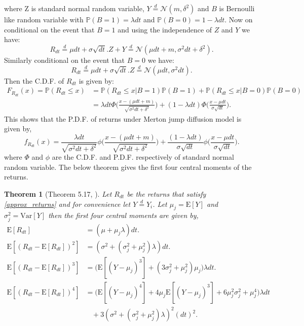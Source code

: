 \documentclass[12pt]{report}
\newtheorem{theorem}{Theorem}[section]
\newcommand{\E}{\mathrm{E}}
\newcommand{\Var}{\mathrm{Var}}
\begin{document}
where Z is standard normal random variable, $Y \stackrel{d}{=} \mathcal{N}(m,\delta^{2}) $  and $B$ is Bernoulli like random variable with $\mathbb{P}(B = 1) = \lambda dt$ and $\mathbb{P}(B = 0) = 1 - \lambda dt$.
Now on conditional on the event that $B=1$ and using the independence of $Z$ and $Y$ we have:
\begin{equation}
    R_{dt} \stackrel{d}{=} \mu dt + \sigma \sqrt{dt}.Z + Y \stackrel{d}{=} \mathcal{N}(\mu dt + m, \sigma^{2} dt + \delta^{2} ).   
\end{equation}
Similarly conditional on the event that $B=0$ we have:
\begin{equation}
    R_{dt} \stackrel{d}{=} \mu dt + \sigma \sqrt{dt}.Z  \stackrel{d}{=} \mathcal{N}(\mu dt, \sigma^{2} dt ).   
\end{equation}
Then the C.D.F. of $R_{dt}$  is given by:
\begin{align*}
    F_{R_{dt}}(x) = \mathbb{P}(R_{dt} \leq x) &= \mathbb{P}(R_{dt} \leq x | B =1) \mathbb{P}(B =1) + \mathbb{P}(R_{dt} \leq x | B = 0) \mathbb{P}(B =0)\\
    & = \lambda dt  \Phi\Bigg(\frac{x - (\mu dt + m)}{\sqrt{\sigma^{2} dt + \delta^{2}}}\Bigg) + (1 - \lambda dt) \Phi\Bigg(\frac{x-\mu dt}{\sigma \sqrt{dt}}\Bigg).
\end{align*}
This shows that the P.D.F. of returns under Merton jump diffusion model is given by,
\begin{equation}
    f_{R_{dt}}(x) =  \frac{\lambda dt}{\sqrt{\sigma^{2} dt + \delta^{2}}}  \phi\Bigg(\frac{x - (\mu dt + m)}{\sqrt{\sigma^{2} dt + \delta^{2}}}\Bigg) + \frac{(1 - \lambda dt)}{\sigma \sqrt{dt}} \phi\Bigg(\frac{x-\mu dt}{\sigma \sqrt{dt}}\Bigg).
\label{mjd_density}    
\end{equation}
where $\Phi$ and $\phi$ are the C.D.F. and P.D.F. respectively of standard normal random variable.
The below theorem gives the first four central moments of the returns.
\begin{theorem}[Theorem 5.17, \cite{hanson_2007}]
 Let $R_{dt}$ be the returns that satisfy \ref{approx_returns} and for convenience let $Y \stackrel{d}{=} Y_i$. Let $\mu_{j} = \E[Y]$ and $\sigma^{2}_j = \Var[Y]$ then the first four central moments are given by,\\
 \begin{equation}
     \begin{aligned}
       \E[R_{dt}] &= (\mu  + \mu_{j} \lambda) dt.\\
       \E[(R_{dt}- \E[R_{dt}])^{2}] &= (\sigma^{2} + (\sigma^{2}_j + \mu^{2}_{j}) \lambda) dt.\\
       \E[(R_{dt}- \E[R_{dt}])^{3}] &= \Big(\E[(Y- \mu_{j})^{3}] + (3 \sigma^{2}_j + \mu^{2}_{j}) \mu_{j}\Big)  \lambda dt.\\
       \E[(R_{dt}- \E[R_{dt}])^{4}] &= \Big(\E[(Y- \mu_{j})^{4}] + 4 \mu_j \E[(Y- \mu_{j})^{3}] + 6 \mu^{2}_{j} \sigma^{2}_j + \mu^{4}_j \Big) \lambda dt\\
       & ~~~~ + 3 (\sigma^{2} + (\sigma^{2}_j + \mu^{2}_{j})\lambda)^{2}(dt)^{2}.
     \end{aligned}
     \label{moments}
 \end{equation}
\end{theorem}
\end{document}
